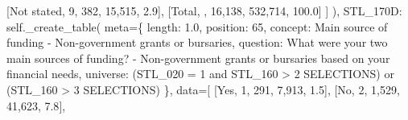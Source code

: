\documentclass[
  11pt,
  a4paper,
]{article}
\newenvironment{Shaded}{\begin{snugshade}}{\end{snugshade}}
\newcommand{\NormalTok}[1]{\textcolor[rgb]{0.00,0.23,0.31}{#1}}
\newcommand{\OperatorTok}[1]{\textcolor[rgb]{0.37,0.37,0.37}{#1}}
\newcommand{\StringTok}[1]{\textcolor[rgb]{0.13,0.47,0.30}{#1}}
\newcommand{\VariableTok}[1]{\textcolor[rgb]{0.07,0.07,0.07}{#1}}
\begin{document}
\begin{Shaded}
\begin{Highlighting}[]
\NormalTok{                    [}\StringTok{\textquotesingle{}Not stated\textquotesingle{}}\NormalTok{, }\StringTok{\textquotesingle{}9\textquotesingle{}}\NormalTok{, }\StringTok{\textquotesingle{}382\textquotesingle{}}\NormalTok{, }\StringTok{\textquotesingle{}15,515\textquotesingle{}}\NormalTok{, }\StringTok{\textquotesingle{}2.9\textquotesingle{}}\NormalTok{],}
\NormalTok{                    [}\StringTok{\textquotesingle{}Total\textquotesingle{}}\NormalTok{, }\StringTok{\textquotesingle{}\textquotesingle{}}\NormalTok{, }\StringTok{\textquotesingle{}16,138\textquotesingle{}}\NormalTok{, }\StringTok{\textquotesingle{}532,714\textquotesingle{}}\NormalTok{, }\StringTok{\textquotesingle{}100.0\textquotesingle{}}\NormalTok{]}
\NormalTok{                ]}
\NormalTok{            ),}
            \StringTok{\textquotesingle{}STL\_170D\textquotesingle{}}\NormalTok{: }\VariableTok{self}\NormalTok{.\_create\_table(}
\NormalTok{                meta}\OperatorTok{=}\NormalTok{\{}
                    \StringTok{\textquotesingle{}length\textquotesingle{}}\NormalTok{: }\StringTok{\textquotesingle{}1.0\textquotesingle{}}\NormalTok{, }\StringTok{\textquotesingle{}position\textquotesingle{}}\NormalTok{: }\StringTok{\textquotesingle{}65\textquotesingle{}}\NormalTok{,}
                    \StringTok{\textquotesingle{}concept\textquotesingle{}}\NormalTok{: }\StringTok{\textquotesingle{}Main source of funding {-} Non{-}government grants or bursaries\textquotesingle{}}\NormalTok{,}
                    \StringTok{\textquotesingle{}question\textquotesingle{}}\NormalTok{: }\StringTok{\textquotesingle{}What were your two main sources of funding? {-} Non{-}government grants or bursaries based on your financial needs\textquotesingle{}}\NormalTok{,}
                    \StringTok{\textquotesingle{}universe\textquotesingle{}}\NormalTok{: }\StringTok{\textquotesingle{}(STL\_020 = 1 and STL\_160 \textgreater{} 2 SELECTIONS) or (STL\_160 \textgreater{} 3 SELECTIONS)\textquotesingle{}}
\NormalTok{                \},}
\NormalTok{                data}\OperatorTok{=}\NormalTok{[}
\NormalTok{                    [}\StringTok{\textquotesingle{}Yes\textquotesingle{}}\NormalTok{, }\StringTok{\textquotesingle{}1\textquotesingle{}}\NormalTok{, }\StringTok{\textquotesingle{}291\textquotesingle{}}\NormalTok{, }\StringTok{\textquotesingle{}7,913\textquotesingle{}}\NormalTok{, }\StringTok{\textquotesingle{}1.5\textquotesingle{}}\NormalTok{],}
\NormalTok{                    [}\StringTok{\textquotesingle{}No\textquotesingle{}}\NormalTok{, }\StringTok{\textquotesingle{}2\textquotesingle{}}\NormalTok{, }\StringTok{\textquotesingle{}1,529\textquotesingle{}}\NormalTok{, }\StringTok{\textquotesingle{}41,623\textquotesingle{}}\NormalTok{, }\StringTok{\textquotesingle{}7.8\textquotesingle{}}\NormalTok{],}

\end{Highlighting}
\end{Shaded}
\end{document}
